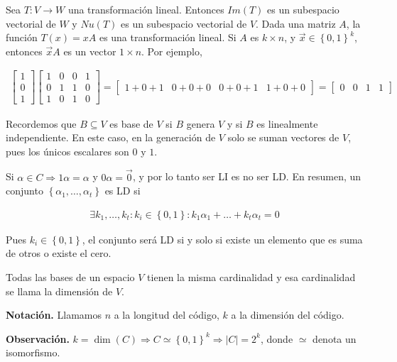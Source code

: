 \documentclass[a4paper]{article}
\begin{document}
Sea $T : V \to W$ una transformación lineal. Entonces $Im(T)$ es un subespacio
vectorial de $W$ y $Nu(T)$ es un subespacio vectorial de $V$. Dada una matriz
$A$, la función $T(x) = xA$ es una transformación lineal. Si $A$ es $k \times
n$, y $\overrightarrow{x} \in \left\{ 0, 1 \right\}^{k} $, entonces
$\overrightarrow{x}A$ es un vector $1 \times n$. Por ejemplo,

\begin{align*}
    \begin{bmatrix} 
        1 \\ 0 \\ 1
    \end{bmatrix} \begin{bmatrix} 
    1 & 0 & 0 & 1 \\ 
    0 & 1 & 1 & 0 \\ 
    1 & 0 & 1 & 0
    \end{bmatrix} = \begin{bmatrix} 
    1 + 0 + 1 & 0 + 0 + 0 & 0 + 0 + 1 & 1 + 0 + 0 
    \end{bmatrix} = \begin{bmatrix} 
    0 & 0 & 1 &  1
    \end{bmatrix} 
\end{align*}

Recordemos que $B \subseteq V$ es base de $V$ si $B$ genera $V$ y si $B$ es
linealmente independiente. En este caso, en la generación de $V$ solo se suman
vectores de $V$, pues los únicos escalares son $0$ y $1$. 

Si $\alpha \in C \Rightarrow 1\alpha = \alpha$ y $0\alpha =
\overrightarrow{0}$, y por lo tanto ser LI es no ser LD. En resumen, 
un conjunto $\left\{ \alpha_1, \ldots, \alpha_t \right\}$ es LD si 

\begin{align*}
    \exists k_1, \ldots, k_t : k_i \in \left\{ 0, 1 \right\} :  k_1 \alpha_1 + \ldots + k_t \alpha_t = 0
\end{align*}

Pues $k_i \in \left\{ 0, 1 \right\} $, el conjunto será LD si y solo si existe
un elemento que es suma de otros o existe el cero.

Todas las bases de un espacio $V$ tienen la misma cardinalidad y esa
cardinalidad se llama la dimensión de $V$.

\textbf{Notación.} Llamamos $n$ a la longitud del código, $k$ a la dimensión
del código.

\textbf{Observación.} $k = \dim(C) \Rightarrow C \simeq \left\{ 0, 1 \right\}^k
\Rightarrow |C| = 2^k $, donde $\simeq$ denota un isomorfismo.
\end{document}
